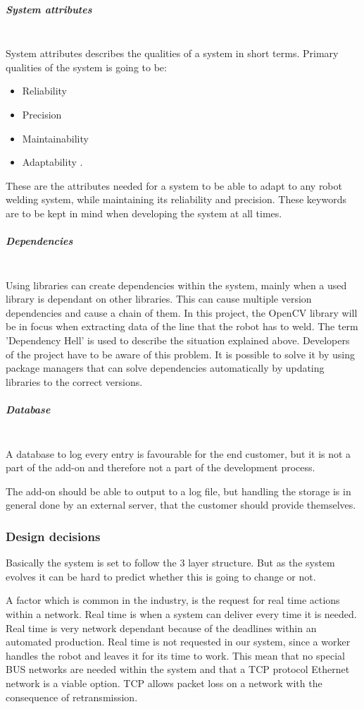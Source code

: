 \subparagraph*{System attributes}~\\
System attributes describes the qualities of a system in short terms. Primary qualities of the system is going to be:

\begin{itemize}

\item Reliability
\item Precision
\item Maintainability
\item Adaptability
. 
\end{itemize}
These are the attributes needed for a system to be able to adapt to any robot welding system, while maintaining its reliability and precision. These keywords are to be kept in mind when developing the system at all times.

\subparagraph*{Dependencies}~\\
Using libraries can create dependencies within the system, mainly when a used library is dependant on other libraries. This can cause multiple version dependencies and cause a chain of them. In this project, the OpenCV library will be in focus when extracting data of the line that the robot has to weld. The term 'Dependency Hell' is used to describe the situation explained above. Developers of the project have to be aware of this problem. It is possible to solve it by using package managers that can solve dependencies automatically by updating libraries to the correct versions. 

\subparagraph*{Database}~\\
A database to log every entry is favourable for the end customer, but it is not a part of the add-on and therefore not a part of the development process.

The add-on should be able to output to a log file, but handling the storage is in general done by an external server, that the customer should provide themselves.

\subsubsection{Design decisions}
Basically the system is set to follow the 3 layer structure. But as the system evolves it can be hard to predict whether this is going to change or not. 

A factor which is common in the industry, is the request for real time actions within a network. Real time is when a system can deliver every time it is needed. Real time is very network dependant because of the deadlines within an automated production. 
Real time is not requested in our system, since a worker handles the robot and leaves it for its time to work. This mean that no special BUS networks are needed within the system and that a TCP protocol Ethernet network is a viable option. TCP allows packet loss on a network with the consequence of retransmission.

